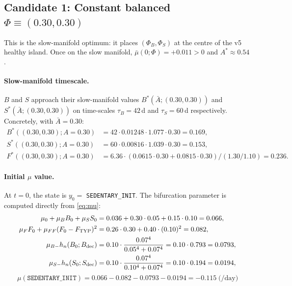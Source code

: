 \documentclass[11pt,a4paper]{article}
\theoremstyle{definition}
\begin{document}
\subsection{Candidate 1: Constant balanced $\Phi \equiv (0.30, 0.30)$}

This is the slow-manifold optimum: it places $(\Phi_B, \Phi_S)$ at the centre of the v5 healthy island. Once on the slow manifold, $\bar\mu(0; \Phi) = +0.011 > 0$ and $A^* \approx 0.54$.

\paragraph{Slow-manifold timescale.}
$B$ and $S$ approach their slow-manifold values $B^*(\bar A; (0.30, 0.30))$ and $S^*(\bar A; (0.30, 0.30))$ on time-scales $\tau_B = 42$\,d and $\tau_S = 60$\,d respectively. Concretely, with $\bar A = 0.30$:
\begin{align*}
B^*((0.30, 0.30); A=0.30) &= 42 \cdot 0.01248 \cdot 1.077 \cdot 0.30 = 0.169, \\
S^*((0.30, 0.30); A=0.30) &= 60 \cdot 0.00816 \cdot 1.039 \cdot 0.30 = 0.153, \\
F^*((0.30, 0.30); A=0.30) &= 6.36 \cdot (0.0615 \cdot 0.30 + 0.0815 \cdot 0.30) / (1.30/1.10) = 0.236.
\end{align*}

\paragraph{Initial $\mu$ value.}
At $t = 0$, the state is $y_0 = $ \texttt{SEDENTARY\_INIT}. The bifurcation parameter is computed directly from \eqref{eq:mu}:
\begin{align*}
\mu_0 + \mu_B B_0 + \mu_S S_0 &= 0.036 + 0.30 \cdot 0.05 + 0.15 \cdot 0.10 = 0.066, \\
\mu_F F_0 + \mu_{FF}(F_0 - F_{\rm TYP})^2 &= 0.26 \cdot 0.30 + 0.40 \cdot (0.10)^2 = 0.082, \\
\mu_{B-} h_n(B_0; B_{\rm dec}) &= 0.10 \cdot \frac{0.07^4}{0.05^4 + 0.07^4} = 0.10 \cdot 0.793 = 0.0793, \\
\mu_{S-} h_n(S_0; S_{\rm dec}) &= 0.10 \cdot \frac{0.07^4}{0.10^4 + 0.07^4} = 0.10 \cdot 0.194 = 0.0194,
\end{align*}
\begin{equation}
\boxed{\;\mu(\texttt{SEDENTARY\_INIT}) = 0.066 - 0.082 - 0.0793 - 0.0194 = -0.115 \;\text{(/day)}\;}
\label{eq:mu-init}
\end{equation}
\end{document}
